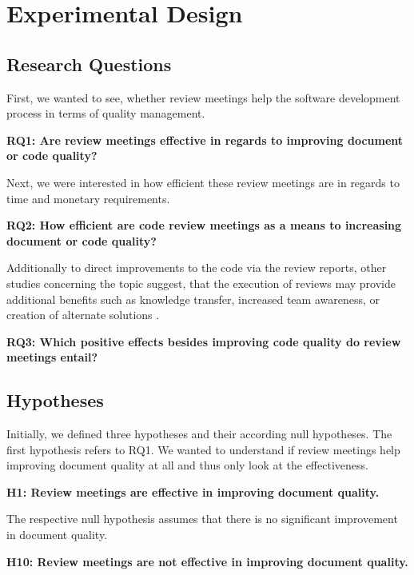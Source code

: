 \section{Experimental Design}

\subsection{Research Questions}
\label{subsec:research_questions}
First, we wanted to see, whether review meetings help the software development process in terms of quality management.

\textbf{RQ1: Are review meetings effective in regards to improving document or code quality?}

Next, we were interested in how efficient these review meetings are in regards to time and monetary requirements.

\textbf{RQ2: How efficient are code review meetings as a means to increasing document or code quality?}

Additionally to direct improvements to the code via the review reports, other studies concerning the topic suggest, that the execution of reviews may provide additional benefits such as knowledge transfer, increased team awareness, or creation of alternate solutions \cite{expecations...}.

\textbf{RQ3: Which positive effects besides improving code quality do review meetings entail?}



\subsection{Hypotheses}

Initially, we defined three hypotheses and their according null hypotheses.
The first hypothesis refers to RQ1. We wanted to understand if review meetings help improving document quality at all and thus only look at the effectiveness.

\textbf{H1: Review meetings are effective in improving document quality.}

The respective null hypothesis assumes that there is no significant improvement in document quality.

\textbf{H10: Review meetings are not effective in improving document quality.}

